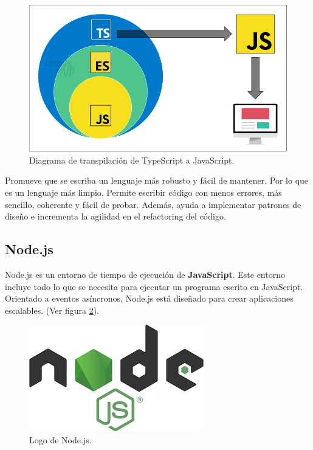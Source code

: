 \documentclass[12pt,twoside,titlepage]{report}
\begin{document}
\begin{figure}[H]
    \centering
    \includegraphics[scale=0.35]{TypeScript/TypeScriptTranspile}
    \caption{Diagrama de transpilación de TypeScript a JavaScript.}
    \label{fig:TypeScript}
\end{figure}

Promueve que se escriba un lenguaje más robusto y fácil de mantener. Por lo que es un lenguaje más limpio. Permite escribir código con menos errores, más sencillo, coherente y fácil de probar. Además, ayuda a implementar patrones de diseño e incrementa la agilidad en el refactoring del código.

\subsection{Node.js}

Node.js es un entorno de tiempo de ejecución de \textbf{JavaScript}. Este entorno incluye todo lo que se necesita para ejecutar un programa escrito en JavaScript. Orientado a eventos asíncronos, Node.js está diseñado para crear aplicaciones escalables.
(Ver figura \ref{fig:NodejsLogo}).

\begin{figure}[H]
    \centering
    \includegraphics[scale=0.4]{Nodejs/Nodejs}
    \caption{Logo de Node.js.}
    \label{fig:NodejsLogo}
\end{figure}
\end{document}
